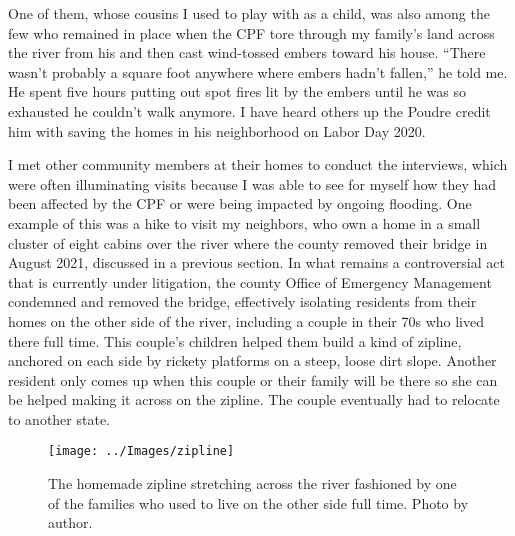 \documentclass[
]{article}
\begin{document}
One of them, whose cousins I used to play with as a child, was also among the few who remained in place when the CPF tore through my family's land across the river from his and then cast wind-tossed embers toward his house. ``There wasn't probably a square foot anywhere where embers hadn't fallen,'' he told me. He spent five hours putting out spot fires lit by the embers until he was so exhausted he couldn't walk anymore. I have heard others up the Poudre credit him with saving the homes in his neighborhood on Labor Day 2020.

I met other community members at their homes to conduct the interviews, which were often illuminating visits because I was able to see for myself how they had been affected by the CPF or were being impacted by ongoing flooding. One example of this was a hike to visit my neighbors, who own a home in a small cluster of eight cabins over the river where the county removed their bridge in August 2021, discussed in a previous section. In what remains a controversial act that is currently under litigation, the county Office of Emergency Management condemned and removed the bridge, effectively isolating residents from their homes on the other side of the river, including a couple in their 70s who lived there full time. This couple's children helped them build a kind of zipline, anchored on each side by rickety platforms on a steep, loose dirt slope. Another resident only comes up when this couple or their family will be there so she can be helped making it across on the zipline. The couple eventually had to relocate to another state.

\begin{figure}
\texttt{[image: ../Images/zipline]} \caption[Zipline]{The homemade zipline stretching across the river fashioned by one of the families who used to live on the other side full time. Photo by author.}\label{fig:figureTitle-27}
\end{figure}
\end{document}
